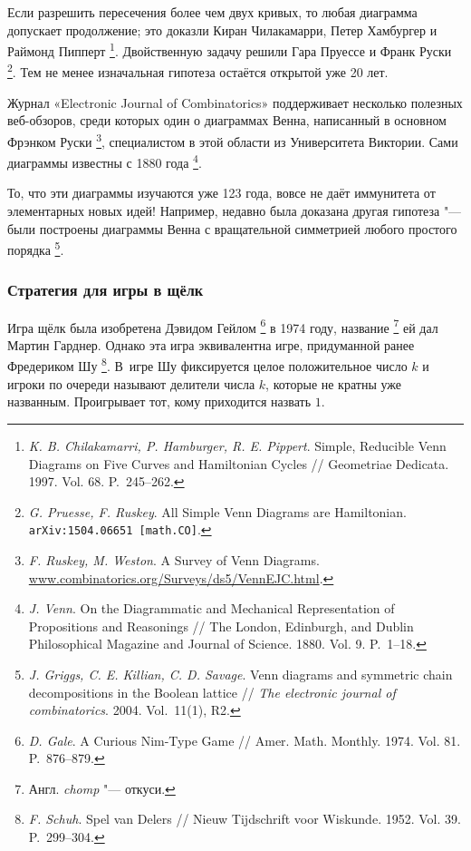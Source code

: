 \documentclass[twoside]{book}
\begin{document}
Если разрешить пересечения более чем двух кривых, то любая диаграмма допускает продолжение; это доказли Киран Чилакамарри, Петер Хамбургер и Раймонд Пипперт%
\footnote{\emph{K. B. Chilakamarri, P. Hamburger, R. E. Pippert}.
Simple, Reducible Venn Diagrams on Five Curves and Hamiltonian Cycles /\!/ {Geometriae Dedicata}. 1997. Vol. 68. P.~245--262.}.
Двойственную задачу решили Гара Пруессе и Франк Руски%
\footnote{\emph{G. Pruesse, F. Ruskey}.
All Simple Venn Diagrams are Hamiltonian.
\texttt{arXiv:1504.06651 [math.CO]}.}.
Тем не менее изначальная гипотеза остаётся открытой уже 20 лет.

Журнал «Electronic Journal of Combinatorics» поддерживает не\-сколь\-ко полезных веб-обзоров, среди которых один о диаграммах Венна, написанный в основном Фрэнком Руски%
\footnote{\emph{F. Ruskey, M. Weston}. {A Survey of Venn Diagrams}. \href{http://www.combinatorics.org/Surveys/ds5/VennEJC.html}{\url{www.combinatorics.org/Surveys/ds5/VennEJC.html}}.}, специалистом в этой области из Университета Виктории.
Сами диаграммы известны с 1880 года%
\footnote{\emph{J. Venn}.
On the Diagrammatic and Mechanical Representation of Propositions and Reasonings /\!/ {The London, Edinburgh, and Dublin Philosophical Magazine and Journal of Science}. 1880. Vol. 9. P.~1--18.}.



То, что эти диаграммы изучаются уже 123 года, вовсе не даёт иммунитета
от элементарных новых идей!  Например, недавно была доказана другая
гипотеза "--- были построены диаграммы Венна с вращательной симметрией
любого простого порядка%
\footnote{\emph{J. Griggs, C. E. Killian, C. D. Savage}. Venn diagrams and symmetric chain decom\-po\-si\-tions in the Boolean lattice /\!/
\emph{The electronic journal of combinatorics}. 2004. Vol.~11(1), R2.}.

\subsubsection*{Стратегия для игры в щёлк}

Игра щёлк была изобретена Дэвидом Гейлом%
\footnote{\emph{D. Gale}. A Curious Nim-Type Game /\!/ {Amer. Math. Monthly}. 1974. Vol. 81. P.~876--879.} в 1974 году, название%
\footnote{Англ. \emph{chomp} "---  откуси.}
 ей дал Мартин Гарднер.
Однако эта игра эквивалентна игре, придуманной ранее Фредериком Шу%
\footnote{\emph{F. Schuh}. Spel van Delers /\!/ {Nieuw Tijdschrift   voor Wiskunde}. 1952. Vol. 39. P.~299--304.}.
В~игре
Шу фиксируется целое положительное число $k$ и игроки по очереди
называют делители числа $k$, которые не кратны уже названным.
Проигрывает тот, кому приходится назвать $1$.
\end{document}
